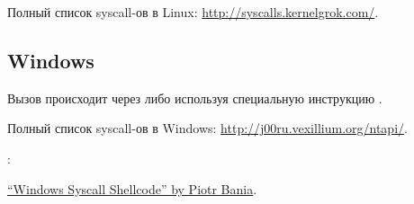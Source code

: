 Полный список syscall-ов в Linux: \url{http://syscalls.kernelgrok.com/}.

\subsection{Windows}


Вызов происходит через  либо используя специальную инструкцию .

Полный список syscall-ов в Windows: \url{http://j00ru.vexillium.org/ntapi/}.

:

\href{http://www.symantec.com/connect/articles/windows-syscall-shellcode}
{``Windows Syscall Shellcode'' by Piotr Bania}.


